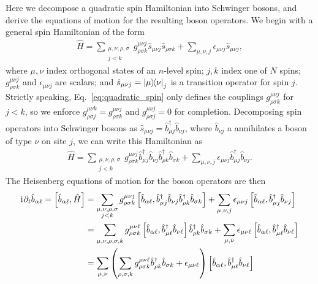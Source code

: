 \documentclass[aps,pra,nofootinbib,twocolumn,superscriptaddress]{revtex4-2}
\newcommand{\p}[1]{\left(#1\right)} %
\renewcommand{\sp}[1]{\left[#1\right]} %
\renewcommand{\i}{\mathrm{i}\mkern1mu} %
\newcommand{\1}{\mathds{1}}
\renewcommand{\b}{\hat b}
\newcommand{\s}{\hat s}
\renewcommand{\H}{\hat H}
\begin{document}
Here we decompose a quadratic spin Hamiltonian into Schwinger bosons, and derive the equations of motion for the resulting boson operators.
We begin with a general spin Hamiltonian of the form
\begin{align}
  \H = \sum_{\substack{\mu,\nu,\rho,\sigma\\j<k}}
  g^{\mu\nu j}_{\rho\sigma k} \s_{\mu\nu j} \s_{\rho\sigma k}
  + \sum_{\mu,\nu,j} \epsilon_{\mu\nu j} \s_{\mu\nu j},
  \label{eq:quadratic_spin}
\end{align}
where $\mu,\nu$ index orthogonal states of an $n$-level spin; $j,k$ index one of $N$ spins; $g^{\mu\nu j}_{\rho\sigma k}$ and $\epsilon_{\mu\nu j}$ are scalars; and $\s_{\mu\nu j}=\op{\mu}{\nu}_j$ is a transition operator for spin $j$.
Strictly speaking, Eq.~\eqref{eq:quadratic_spin} only defines the couplings $g^{\mu\nu j}_{\rho\sigma k}$ for $j<k$, so we enforce $g^{\mu\nu k}_{\rho\sigma j}=g^{\mu\nu j}_{\rho\sigma k}$ and $g^{\mu\nu j}_{\rho\sigma j}=0$ for completion.
Decomposing spin operators into Schwinger bosons as $\s_{\mu\nu j}=\b_{\mu j}^\dag \b_{\nu j}$, where $\b_{\nu j}$ a annihilates a boson of type $\nu$ on site $j$, we can write this Hamiltonian as
\begin{align}
  \H = \sum_{\substack{\mu,\nu,\rho,\sigma\\j<k}}
  g^{\mu\nu j}_{\rho\sigma k}
  \b_{\mu j}^\dag \b_{\nu j} \b_{\rho k}^\dag \b_{\sigma k}
  + \sum_{\mu,\nu,j} \epsilon_{\mu\nu j} \b_{\mu j}^\dag \b_{\nu j}.
\end{align}
The Heisenberg equations of motion for the boson operators are then
\begin{align}
  \i \partial_t \b_{\alpha\ell} = \sp{\b_{\alpha\ell}, \H}
  &= \sum_{\substack{\mu,\nu,\rho,\sigma\\j<k}}
  g^{\mu\nu j}_{\rho\sigma k}
  \sp{\b_{\alpha\ell}, \b_{\mu j}^\dag \b_{\nu j} \b_{\rho k}^\dag \b_{\sigma k}}
  + \sum_{\mu,\nu,j} \epsilon_{\mu\nu j}
  \sp{\b_{\alpha\ell}, \b_{\mu j}^\dag \b_{\nu j}} \\
  &= \sum_{\mu,\nu,\rho,\sigma,k} g^{\mu\nu\ell}_{\rho\sigma k}
  \sp{\b_{\alpha\ell}, \b_{\mu\ell}^\dag \b_{\nu\ell}}
  \b_{\rho k}^\dag \b_{\sigma k}
  + \sum_{\mu,\nu} \epsilon_{\mu\nu\ell}
  \sp{\b_{\alpha\ell}, \b_{\mu\ell}^\dag \b_{\nu\ell}} \\
  &= \sum_{\mu,\nu} \p{\sum_{\rho,\sigma,k}
    g^{\mu\nu\ell}_{\rho\sigma k} \b_{\rho k}^\dag \b_{\sigma k}
    + \epsilon_{\mu\nu\ell}}
  \sp{\b_{\alpha\ell}, \b_{\mu\ell}^\dag \b_{\nu\ell}}
\end{align}
\end{document}
